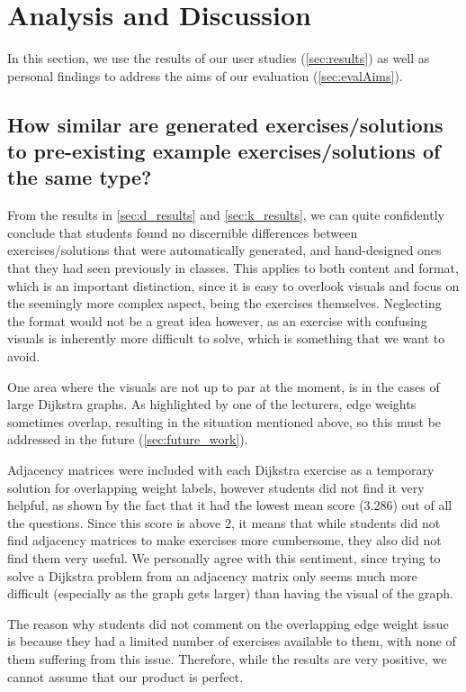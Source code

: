 \documentclass{l4proj}
\begin{document}
\section{Analysis and Discussion}
\label{sec:analysis}

In this section, we use the results of our user studies (\autoref{sec:results}) as well as personal findings to address the aims of our evaluation (\autoref{sec:evalAims}).

\subsection*{How similar are generated exercises/solutions to pre-existing example exercises/solutions of the same type?}

From the results in \autoref{sec:d_results} and \autoref{sec:k_results}, we can quite confidently conclude that students found no discernible differences between exercises/solutions that were automatically generated, and hand-designed ones that they had seen previously in classes. This applies to both content and format, which is an important distinction, since it is easy to overlook visuals and focus on the seemingly more complex aspect, being the exercises themselves. Neglecting the format would not be a great idea however, as an exercise with confusing visuals is inherently more difficult to solve, which is something that we want to avoid.

One area where the visuals are not up to par at the moment, is in the cases of large Dijkstra graphs. As highlighted by one of the lecturers, edge weights sometimes overlap, resulting in the situation mentioned above, so this must be addressed in the future (\autoref{sec:future_work}). 

Adjacency matrices were included with each Dijkstra exercise as a temporary solution for overlapping weight labels, however students did not find it very helpful, as shown by the fact that it had the lowest mean score ($3.286$) out of all the questions. Since this score is above $2$, it means that while students did not find adjacency matrices to make exercises more cumbersome, they also did not find them very useful. We personally agree with this sentiment, since trying to solve a Dijkstra problem from an adjacency matrix only seems much more difficult (especially as the graph gets larger) than having the visual of the graph.

The reason why students did not comment on the overlapping edge weight issue is because they had a limited number of exercises available to them, with none of them suffering from this issue. Therefore, while the results are very positive, we cannot assume that our product is perfect.
\end{document}
